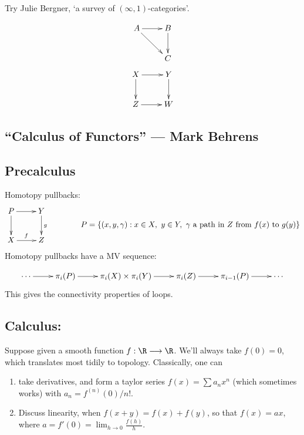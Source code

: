 \documentclass[11pt]{article}
\newcommand{\KanSemResponse}[1]
{
\thispagestyle{fancy}
\subsection*{#1}
}
\begin{document}
\begin{GeoffroyWeakAssociativityandCompleteSegalSpaces}

Try Julie Bergner, `a survey of $(\infty,1)$-categories'.

\[\xymatrix{
A\ar[r]\ar[dr]&B\ar[d]\\
&C
}\]
\[\xymatrix{
X\ar[r]\ar[d]&Y\ar[d]\\
Z\ar[r]&W
}\]
\pagebreak
\end{GeoffroyWeakAssociativityandCompleteSegalSpaces}

\begin{BehrensGoodwillieCalcIntro}
\KanSemResponse
{``Calculus of Functors'' --- Mark Behrens}
\subsection*{Precalculus}
Homotopy pullbacks:
\[\xymatrix{
P\ar[r]\ar[d]&Y\ar[d]^g\\
X\ar[r]^f&Z
} \qquad \qquad \raisebox{-6mm}{$P=\left\{(x,y,\gamma):x\in X,\ y\in Y,\ \gamma\textup{ a path in $Z$ from $f(x)$ to $g(y)$}\right\}$}\]
Homotopy pullbacks have a MV sequence:

\[\xymatrix{\cdots\ar[r]&
\pi_i(P)\ar[r]&
\pi_i(X)\times\pi_i(Y)\ar[r]&
\pi_i(Z)\ar[r]&
\pi_{i-1}(P)\ar[r]&
\cdots}\]
This gives the connectivity properties of loops.
\subsection*{Calculus:}
Suppose given a smooth function $f:\R\to\R$. We'll always take $f(0)=0$, which translates most tidily to topology. Classically, one can
\begin{enumerate}\squishlist
\item take derivatives, and form a taylor series $f(x)=\sum a_nx^n$ (which sometimes works) with $a_n=f^{(n)}(0)/n!$.
\item Discuss linearity, when $f(x+y)=f(x)+f(y)$, so that $f(x)=ax$, where $a=f'(0)=\lim_{h\rightarrow0} \frac{f(h)}{h}$.
\end{enumerate}

\end{BehrensGoodwillieCalcIntro}
\end{document}
